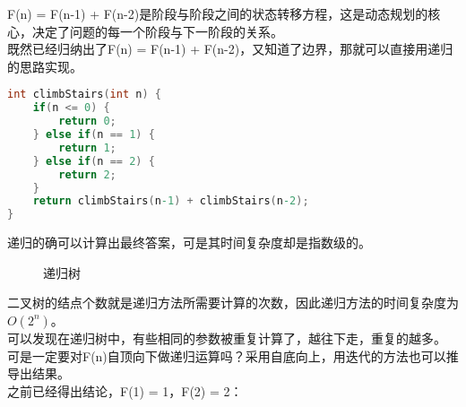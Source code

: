 F(n) = F(n-1) + F(n-2)是阶段与阶段之间的状态转移方程，这是动态规划的核心，决定了问题的每一个阶段与下一阶段的关系。 \\

既然已经归纳出了F(n) = F(n-1) + F(n-2)，又知道了边界，那就可以直接用递归的思路实现。 \\


\begin{lstlisting}[language=C]
int climbStairs(int n) {
    if(n <= 0) {
        return 0;
    } else if(n == 1) {
        return 1;
    } else if(n == 2) {
        return 2;
    }
    return climbStairs(n-1) + climbStairs(n-2);
}
\end{lstlisting}

递归的确可以计算出最终答案，可是其时间复杂度却是指数级的。 \\

\begin{figure}[H]
	\centering
	\caption{递归树}
\end{figure}

二叉树的结点个数就是递归方法所需要计算的次数，因此递归方法的时间复杂度为$ O(2^n) $。 \\

可以发现在递归树中，有些相同的参数被重复计算了，越往下走，重复的越多。 \\

可是一定要对F(n)自顶向下做递归运算吗？采用自底向上，用迭代的方法也可以推导出结果。 \\

之前已经得出结论，F(1) = 1，F(2) = 2：

\begin{table}[H]
	\centering
\end{table}


